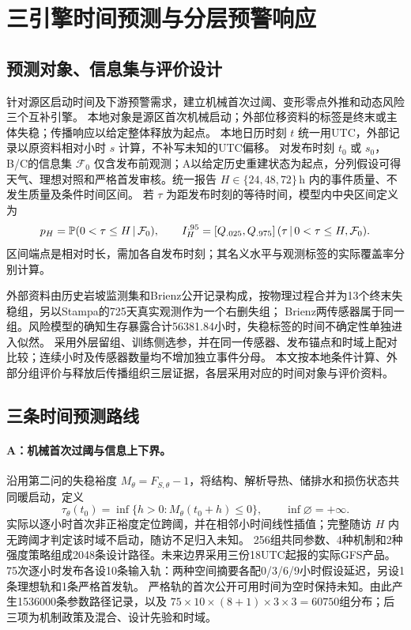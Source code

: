 \section{三引擎时间预测与分层预警响应}\label{q3:sec}

\subsection{预测对象、信息集与评价设计}\label{q3:sec:design}
针对源区启动时间及下游预警需求，建立机械首次过阈、变形零点外推和动态风险三个互补引擎。
本地对象是源区首次机械启动；外部位移资料的标签是终末或主体失稳；传播响应以给定整体释放为起点。
本地日历时刻 $t$ 统一用UTC，外部记录以原资料相对小时 $s$ 计算，不补写未知的UTC偏移。
对发布时刻 $t_0$ 或 $s_0$，B/C的信息集 $\mathcal F_0$ 仅含发布前观测；A以给定历史重建状态为起点，分列假设可得天气、理想对照和严格首发审核。统一报告
$H\in\{24,48,72\}\,\mathrm h$ 内的事件质量、不发生质量及条件时间区间。
若 $\tau$ 为距发布时刻的等待时间，模型内中央区间定义为
\begin{equation}
 p_H=\mathbb P(0<\tau\le H\,\vert\,\mathcal F_0),\qquad
 I^{.95}_H=\left[Q_{.025},Q_{.975}\right](\tau\,\vert\,0<\tau\le H,\mathcal F_0).
 \label{q3:eq:interval}
\end{equation}
区间端点是相对时长，需加各自发布时刻；其名义水平与观测标签的实际覆盖率分别计算。

外部资料由历史岩坡监测集和Brienz公开记录构成\cite{q3-leinauer2023,q3-loewdata2024}，按物理过程合并为13个终末失稳组，另以Stampa的725天真实观测作为一个右删失组\cite{q3-schild2026}；
Brienz两传感器属于同一组。风险模型的确知生存暴露合计\num{56381.84}小时，失稳标签的时间不确定性单独进入似然。
采用外层留组、训练侧选参，并在同一传感器、发布锚点和时域上配对比较；连续小时及传感器数量均不增加独立事件分母。
本文按本地条件计算、外部分组评价与释放后传播组织三层证据，各层采用对应的时间对象与评价资料。

\subsection{三条时间预测路线}\label{q3:sec:models}
\paragraph{A：机械首次过阈与信息上下界。}
沿用第二问的失稳裕度 $M_\theta=F_{S,\theta}-1$，将结构、解析导热、储排水和损伤状态共同暖启动，定义
\begin{equation}
 \tau_\theta(t_0)=\inf\{h>0:M_\theta(t_0+h)\le0\},\qquad
 \inf\varnothing=+\infty .\label{q3:eq:firstpass}
\end{equation}
实际以逐小时首次非正裕度定位跨阈，并在相邻小时间线性插值；完整随访 $H$ 内无跨阈才判定该时域不启动，随访不足归入未知。
256组共同参数、4种机制和2种强度策略组成2048条设计路径。未来边界采用三份18UTC起报的实际GFS产品\cite{q3-noaa-gfs-products}。
75次逐小时发布各设10条输入轨：两种空间摘要各配0/3/6/9小时假设延迟，另设1条理想轨和1条严格首发轨。
严格轨的首次公开可用时间为空时保持未知。由此产生\num{1536000}条参数路径记录，以及
$75\times10\times(8+1)\times3\times3=\num{60750}$组分布；后三项为机制政策及混合、设计先验和时域。

